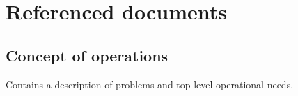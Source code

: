 \chapter{Referenced documents}
\section{Concept of operations}
Contains a description of problems and top-level operational needs.
